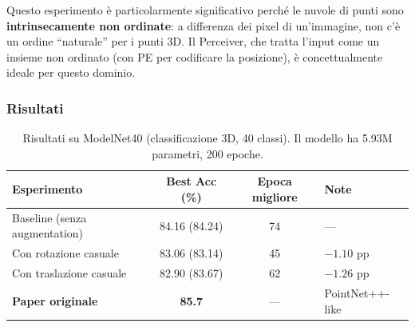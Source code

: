 \documentclass[12pt,a4paper]{article}
\begin{document}
Questo esperimento \`e particolarmente significativo perch\'e le nuvole di punti sono \textbf{intrinsecamente non ordinate}: a differenza dei pixel di un'immagine, non c'\`e un ordine ``naturale'' per i punti 3D. Il Perceiver, che tratta l'input come un insieme non ordinato (con PE per codificare la posizione), \`e concettualmente ideale per questo dominio.

\subsubsection{Risultati}

\begin{table}[htbp]
\centering
\caption{Risultati su ModelNet40 (classificazione 3D, 40 classi). Il modello ha 5.93M parametri, 200 epoche.}
\label{tab:modelnet_risultati}
\begin{tabular}{@{}lccl@{}}
\toprule
\textbf{Esperimento} & \textbf{Best Acc (\%)} & \textbf{Epoca migliore} & \textbf{Note} \\
\midrule
Baseline (senza augmentation) & 84.16 (84.24) & 74 & --- \\
Con rotazione casuale & 83.06 (83.14) & 45 & $-1.10$ pp \\
Con traslazione casuale & 82.90 (83.67) & 62 & $-1.26$ pp \\
\midrule
\textbf{Paper originale} & \textbf{85.7} & --- & PointNet++-like \\
\bottomrule
\end{tabular}
\end{table}

\begin{center}
\end{center}
\end{document}
